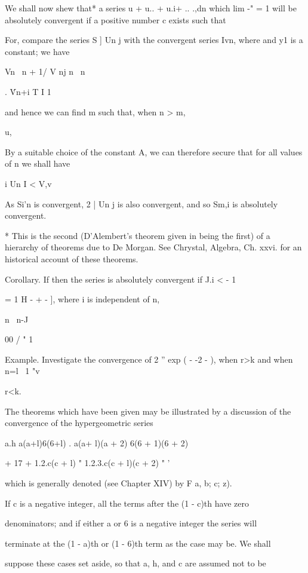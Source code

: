We shall now shew that* a series u + u.. + u.i+ .. .,dn which lim -" =
1 will be absolutely convergent if a positive number c exists such
that

For, compare the series S ] Un j with the convergent series Ivn, where
and y1 is a constant; we have

Vn \ n + 1/ V nj n \ n

. \'Vn+i T I 1

and hence we can find m such that, when n > m,

u,

By a suitable choice of the constant A, we can therefore secure that
for all values of n we shall have

i Un I < V,v

As Si'n is convergent, 2 | Un j is also convergent, and so Sm,i is
absolutely convergent.

* This is the second (D'Alembert's theorem given in being the
first) of a hierarchy of theorems due to De Morgan. See Chrystal,
Algebra, Ch. xxvi. for an historical account of these theorems.

%
%


Corollary. If then the series is absolutely convergent if J.i < - 1

= 1 H - + - ], where i is independent of n,

n \ n-J

00 / " 1 \

Example. Investigate the convergence of 2 '' exp ( - -2 - ), when r>k
and when n=l \ 1 "v

r<k.


The theorems which have been given may be illustrated by a discussion
of the convergence of the hypergeometric series

  a.h a(a+l)6(6+l) . a(a+ l)(a + 2) 6(6 + 1)(6 + 2)

  + 17 + 1.2.c(c + l) " 1.2.3.c(c + l)(c + 2) " '

which is generally denoted (see Chapter XIV) by F a, b; c; z).

If c is a negative integer, all the terms after the (1 - c)th have
zero

denominators; and if either a or 6 is a negative integer the series
will

terminate at the (1 - a)th or (1 - 6)th term as the case may be. We
shall

suppose these cases set aside, so that a, h, and c are assumed not to
be

